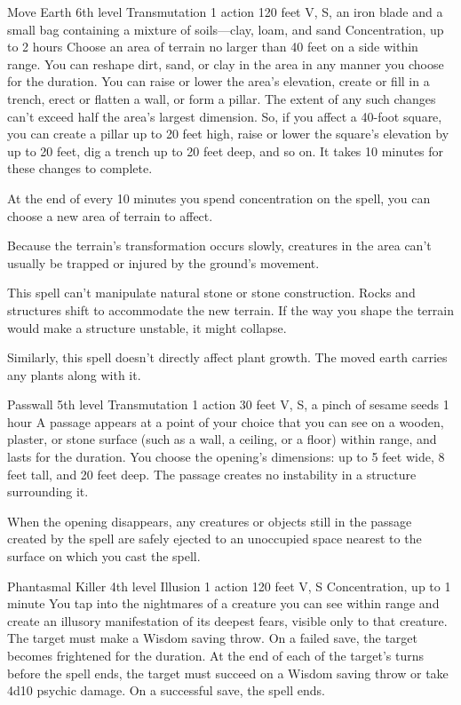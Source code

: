 \documentclass[10pt,a4paper,twoside,bg=print,twocolumn,openany,nodeprecatedcode]{dndbook}
\begin{document}


\DndSpellHeader%
{Move Earth}
{6th level Transmutation}
{1 action}
{120 feet}
{V, S, an iron blade and a small bag containing a mixture of soils—clay, loam, and sand}
{Concentration, up to 2 hours}
Choose an area of terrain no larger than 40 feet on a side within range. You can reshape dirt, sand, or clay in the area in any manner you choose for the duration. You can raise or lower the area's elevation, create or fill in a trench, erect or flatten a wall, or form a pillar. The extent of any such changes can't exceed half the area's largest dimension. So, if you affect a 40-foot square, you can create a pillar up to 20 feet high, raise or lower the square's elevation by up to 20 feet, dig a trench up to 20 feet deep, and so on. It takes 10 minutes for these changes to complete.

At the end of every 10 minutes you spend concentration on the spell, you can choose a new area of terrain to affect.

Because the terrain's transformation occurs slowly, creatures in the area can't usually be trapped or injured by the ground's movement.

This spell can't manipulate natural stone or stone construction. Rocks and structures shift to accommodate the new terrain. If the way you shape the terrain would make a structure unstable, it might collapse.

Similarly, this spell doesn't directly affect plant growth. The moved earth carries any plants along with it.



\DndSpellHeader%
{Passwall}
{5th level Transmutation}
{1 action}
{30 feet}
{V, S, a pinch of sesame seeds}
{1 hour}
A passage appears at a point of your choice that you can see on a wooden, plaster, or stone surface (such as a wall, a ceiling, or a floor) within range, and lasts for the duration. You choose the opening's dimensions: up to 5 feet wide, 8 feet tall, and 20 feet deep. The passage creates no instability in a structure surrounding it.

When the opening disappears, any creatures or objects still in the passage created by the spell are safely ejected to an unoccupied space nearest to the surface on which you cast the spell.



\DndSpellHeader%
{Phantasmal Killer}
{4th level Illusion}
{1 action}
{120 feet}
{V, S}
{Concentration, up to 1 minute}
You tap into the nightmares of a creature you can see within range and create an illusory manifestation of its deepest fears, visible only to that creature. The target must make a Wisdom saving throw. On a failed save, the target becomes frightened for the duration. At the end of each of the target's turns before the spell ends, the target must succeed on a Wisdom saving throw or take 4d10 psychic damage. On a successful save, the spell ends.
\end{document}
